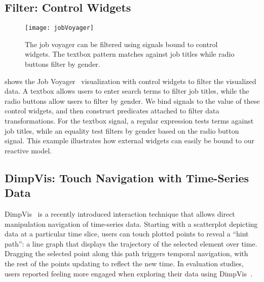 \vspace{-20pt}

\subsection{Filter: Control Widgets}

\vspace{-7pt}

\begin{figure}[b!]
  \centering
  \texttt{[image: jobVoyager]}
  \caption{The job voyager can be filtered using signals bound to control
  widgets. The textbox pattern matches against job titles while radio buttons
  filter by gender.}
  \label{fig:vg:jobVoyager}
\end{figure}

 shows the Job Voyager~\cite{heer:voyagers}
visualization with control widgets to filter the visualized data. A textbox
allows users to enter search terms to filter job titles, while the radio buttons
allow users to filter by gender. We bind signals to the value of these control
widgets, and then construct predicates attached to filter data transformations.
For the textbox signal, a regular expression tests terms against job titles,
while an equality test filters by gender based on the radio button signal. This
example illustrates how external widgets can easily be bound to our reactive
model.

\vspace{-20pt}

\subsection{DimpVis: Touch Navigation with Time-Series Data}

\vspace{-7pt}

DimpVis~\cite{kondo:dimpvis} is a recently introduced interaction technique that
allows direct manipulation navigation of time-series data. Starting with a
scatterplot depicting data at a particular time slice, users can touch plotted
points to reveal a ``hint path'': a line graph that displays the trajectory of
the selected element over time. Dragging the selected point along this path
triggers temporal navigation, with the rest of the points updating to reflect
the new time. In evaluation studies, users reported feeling more engaged when
exploring their data using DimpVis~\cite{kondo:dimpvis}.

